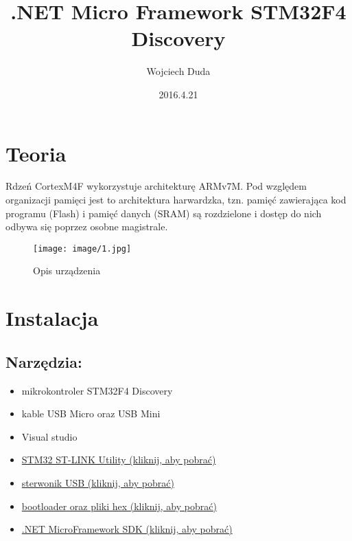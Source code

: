 \documentclass{article}
\title{.NET Micro Framework
STM32F4 Discovery}
\date{2016.4.21}
\author{Wojciech Duda}
\begin{document}
 
\maketitle 
{} 
\newpage
{}
\tableofcontents
\newpage
\section{Teoria}
Rdzeń CortexM4F wykorzystuje architekturę ARMv7M. Pod względem organizacji pamięci jest to architektura harwardzka, tzn. pamięć zawierająca kod programu (Flash) i pamięć danych (SRAM) są rozdzielone i dostęp do nich odbywa się poprzez osobne magistrale.

\begin{figure}[H]
\texttt{[image: image/1.jpg]}
\caption{Opis urządzenia}
\end{figure}
\section{Instalacja}
\subsection{Narzędzia:}
\begin{itemize}
\item mikrokontroler STM32F4 Discovery
\item kable USB Micro oraz USB Mini
\item Visual studio
\item \href{http://www.st.com/content/st_com/en/products/embedded-software/development-tool-software/stsw-link004.html}{STM32 ST-LINK Utility (kliknij, aby pobrać)}
\item \href{www.codeplex.com/Download?ProjectName=netmf4stm32&DownloadId=471395}{sterwonik USB (kliknij, aby pobrać)}
\item \href{www.codeplex.com/Download?ProjectName=netmf4stm32&DownloadId=471396}{bootloader oraz pliki hex (kliknij, aby pobrać)}
\item \href {netmf.codeplex.com/releases/view/91594}{.NET MicroFramework SDK (kliknij, aby pobrać)}
\end{itemize}
\end{document}
